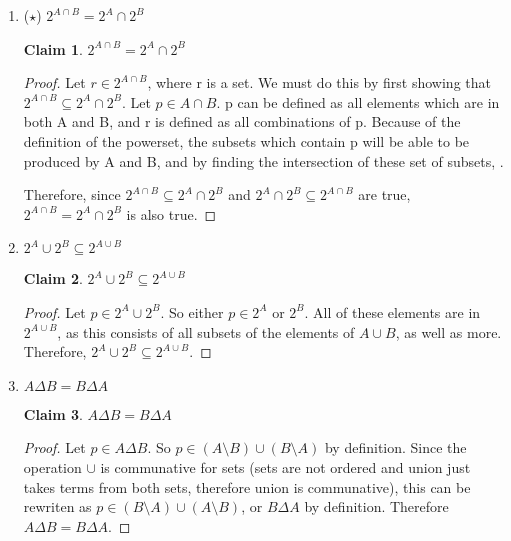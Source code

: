 \documentclass[11pt]{letter}
\newtheorem{claim}{Claim}
\theoremstyle{definition}
\begin{document}
\begin{description}
\begin{enumerate}
\begin{enumerate}
\begin{proof}
\end{proof}
					\item ($\star$)  $2^{A\cap B}=2^A\cap 2^B$
\begin{claim}
$2^{A\cap B}=2^A\cap 2^B$
\end{claim}
\begin{proof}
Let $r\in 2^{A\cap B}$, where r is a set. We must do this by first showing that $2^{A\cap B}\subseteq 2^A \cap 2^B$. Let $p \in A\cap B$. p can be defined as all elements which are in both A and B, and r is defined as all combinations of p. Because of the definition of the powerset, the subsets which contain p will be able to be produced by A and B, and by finding the intersection of these set of subsets, . 




Therefore, since $2^{A\cap B}\subseteq 2^A \cap 2^B$ and $2^A \cap 2^B \subseteq 2^{A\cap B}$ are true,  $2^{A\cap B}=2^A\cap 2^B$ is also true.  
\end{proof}
					\item  $2^A\cup 2^B\subseteq 2^{A\cup B}$
\begin{claim}
$2^A\cup 2^B\subseteq 2^{A\cup B}$
\end{claim}
\begin{proof}
Let $p\in 2^A\cup 2^B$. So either $p\in 2^A$ or $2^B$. All of these elements are in $2^{A\cup B}$, as this consists of all subsets of the elements of $A\cup B$, as well as more. Therefore, $2^A\cup 2^B\subseteq 2^{A\cup B}$.
\end{proof}
					\item $A\Delta B=B\Delta A$
\begin{claim}
$A\Delta B=B\Delta A$
\end{claim}
\begin{proof}
Let $p\in A\Delta B$. So $p\in (A\setminus B)\cup (B\setminus A)$ by definition. Since the operation $\cup$ is communative for sets (sets are not ordered and union just takes terms from both sets, therefore union is communative), this can be rewriten as $p\in (B\setminus A)\cup (A\setminus B)$, or $B\Delta A$ by definition. Therefore $A\Delta B= B\Delta A$. 




\end{proof}
\end{enumerate}
\end{enumerate}
\end{description}
\end{document}
